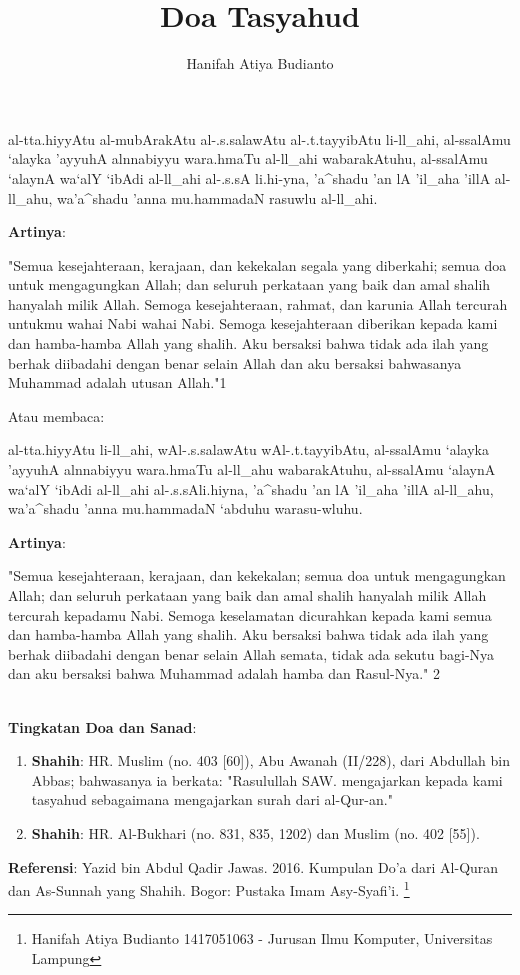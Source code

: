 \documentclass[a4paper,12pt]{article}
\title{\Large Doa Tasyahud}
\author{\calligra Hanifah Atiya Budianto}
\begin{document}
\sffamily
\maketitle 
\fullvocalize
{}
\begin{arabtext}
\noindent
al-tta.hiyyAtu al-mubArakAtu al-.s.salawAtu al-.t.tayyibAtu li-ll_ahi, 
al-ssalAmu `alayka 'ayyuhA alnnabiyyu wara.hmaTu al-ll_ahi wabarakAtuhu, 
al-ssalAmu `alaynA wa`alY `ibAdi al-ll_ahi al-.s.sA li.hi-yna, 'a^shadu 
'an lA 'il_aha 'illA al-ll_ahu, wa'a^shadu 'anna mu.hammadaN rasuwlu 
al-ll_ahi.\\
\end{arabtext}
\noindent
\textbf{Artinya}:
\par
\indent
"Semua kesejahteraan, kerajaan, dan kekekalan segala yang diberkahi; semua 
doa untuk mengagungkan Allah; dan seluruh perkataan yang baik dan amal 
shalih hanyalah milik Allah. Semoga kesejahteraan, rahmat, dan karunia 
Allah tercurah untukmu wahai Nabi wahai Nabi. Semoga kesejahteraan 
diberikan kepada kami dan hamba-hamba Allah yang shalih. Aku bersaksi bahwa
tidak ada ilah yang berhak diibadahi dengan benar selain Allah dan aku 
bersaksi bahwasanya Muhammad adalah utusan Allah."{\scriptsize 1}\\
\par
\indent
Atau membaca:
\begin{arabtext}
\noindent
al-tta.hiyyAtu li-ll_ahi, wAl-.s.salawAtu wAl-.t.tayyibAtu, al-ssalAmu 
`alayka 'ayyuhA alnnabiyyu wara.hmaTu al-ll_ahu wabarakAtuhu, al-ssalAmu 
`alaynA wa`alY `ibAdi al-ll_ahi al-.s.sAli.hiyna, 'a^shadu 'an lA 'il_aha 
'illA al-ll_ahu, wa'a^shadu 'anna mu.hammadaN `abduhu warasu-wluhu.\\
\end{arabtext}
\noindent
\textbf{Artinya}:
\par
\indent
"Semua kesejahteraan, kerajaan, dan kekekalan; semua doa untuk mengagungkan
Allah; dan seluruh perkataan yang baik dan amal shalih hanyalah milik Allah
tercurah kepadamu Nabi. Semoga keselamatan dicurahkan kepada kami semua dan
hamba-hamba Allah yang shalih. Aku bersaksi bahwa tidak ada ilah yang 
berhak diibadahi dengan benar selain Allah semata, tidak ada sekutu 
bagi-Nya dan aku bersaksi bahwa Muhammad adalah hamba dan Rasul-Nya."
{\scriptsize 2}\\\\
\par
\noindent
\textbf{Tingkatan Doa dan Sanad}:
\begin{enumerate}
\item \textbf{Shahih}: HR. Muslim (no. 403 [60]), Abu Awanah (II/228), dari
Abdullah bin Abbas; bahwasanya ia berkata: "Rasulullah SAW. mengajarkan 
kepada kami tasyahud sebagaimana mengajarkan surah dari al-Qur-an."
\item \textbf{Shahih}: HR. Al-Bukhari (no. 831, 835, 1202) dan Muslim (no. 
402 [55]).
\end{enumerate}
\textbf{Referensi}: Yazid bin Abdul Qadir Jawas. 2016. Kumpulan Do'a dari
Al-Quran dan As-Sunnah yang Shahih. Bogor: Pustaka Imam Asy-Syafi'i.
\footnote{Hanifah Atiya Budianto 1417051063 - Jurusan Ilmu Komputer,
Universitas Lampung}
\end{document}
